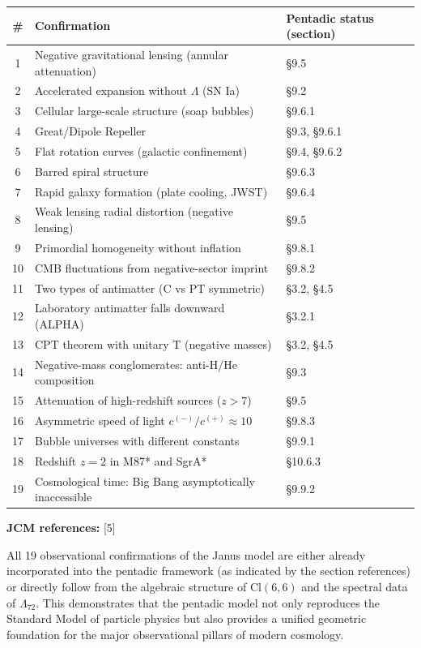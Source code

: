 \documentclass[11pt]{article}
\begin{document}
\begin{table}[H]
\centering
\small
\begin{tabularx}{\textwidth}{@{}cll@{}}
\toprule
\# & \textbf{Confirmation} & \textbf{Pentadic status (section)} \\
\midrule
1 & Negative gravitational lensing (annular attenuation) & §9.5 \\
2 & Accelerated expansion without $\Lambda$ (SN Ia) & §9.2 \\
3 & Cellular large-scale structure (soap bubbles) & §9.6.1 \\
4 & Great/Dipole Repeller & §9.3, §9.6.1 \\
5 & Flat rotation curves (galactic confinement) & §9.4, §9.6.2 \\
6 & Barred spiral structure & §9.6.3 \\
7 & Rapid galaxy formation (plate cooling, JWST) & §9.6.4 \\
8 & Weak lensing radial distortion (negative lensing) & §9.5 \\
9 & Primordial homogeneity without inflation & §9.8.1 \\
10 & CMB fluctuations from negative-sector imprint & §9.8.2 \\
11 & Two types of antimatter (C vs PT symmetric) & §3.2, §4.5 \\
12 & Laboratory antimatter falls downward (ALPHA) & §3.2.1 \\
13 & CPT theorem with unitary T (negative masses) & §3.2, §4.5 \\
14 & Negative-mass conglomerates: anti-H/He composition & §9.3 \\
15 & Attenuation of high-redshift sources ($z>7$) & §9.5 \\
16 & Asymmetric speed of light $c^{(-)}/c^{(+)} \approx 10$ & §9.8.3 \\
17 & Bubble universes with different constants & §9.9.1 \\
18 & Redshift $z=2$ in M87* and SgrA* & §10.6.3 \\
19 & Cosmological time: Big Bang asymptotically inaccessible & §9.9.2 \\
\bottomrule
\end{tabularx}
\end{table}

\textbf{JCM references:} {[}5{]}

All 19 observational confirmations of the Janus model are either already
incorporated into the pentadic framework (as indicated by the section
references) or directly follow from the algebraic structure of
\(\text{Cl}(6,6)\) and the spectral data of \(\Lambda_{72}\). This
demonstrates that the pentadic model not only reproduces the Standard
Model of particle physics but also provides a unified geometric
foundation for the major observational pillars of modern cosmology.
\end{document}
